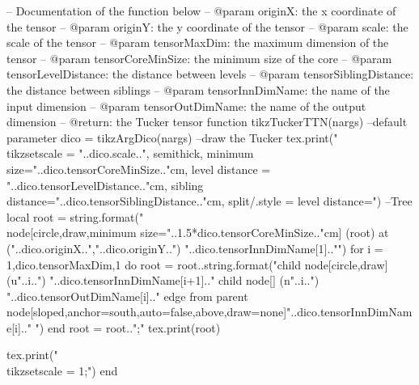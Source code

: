 \begin{luacode*}
	-- Documentation of the function below
	-- @param originX: the x coordinate of the tensor
	-- @param originY: the y coordinate of the tensor
	-- @param scale: the scale of the tensor
	-- @param tensorMaxDim: the maximum dimension of the tensor
	-- @param tensorCoreMinSize: the minimum size of the core
	-- @param tensorLevelDistance: the distance between levels
	-- @param tensorSiblingDistance: the distance between siblings
	-- @param tensorInnDimName: the name of the input dimension
	-- @param tensorOutDimName: the name of the output dimension
	-- @return: the Tucker tensor
	function tikzTuckerTTN(nargs)
	  --default parameter
	  dico = tikzArgDico(nargs)
	  --draw the Tucker
	  tex.print("\\tikzset{scale = "..dico.scale..", semithick, minimum size="..dico.tensorCoreMinSize.."cm, level distance = "..dico.tensorLevelDistance.."cm, sibling distance="..dico.tensorSiblingDistance.."cm, split/.style = {level distance=}}")
	  --Tree
	  local root = string.format("\\node[circle,draw,minimum size="..1.5*dico.tensorCoreMinSize.."cm] (root) at ("..dico.originX..","..dico.originY..") {"..dico.tensorInnDimName[1].."}")
	  for i = 1,dico.tensorMaxDim,1 do 
		root = root..string.format("child { node[circle,draw] (u"..i..") {"..dico.tensorInnDimName[i+1].."} child { node[] (n"..i..") {"..dico.tensorOutDimName[i].."} } edge from parent node[sloped,anchor=south,auto=false,above,draw=none]{"..dico.tensorInnDimName[i].."} }")
	  end
	  root = root..";"
	  tex.print(root)
	  
	  tex.print("\\tikzset{scale = 1};")
	end


\end{luacode*}
